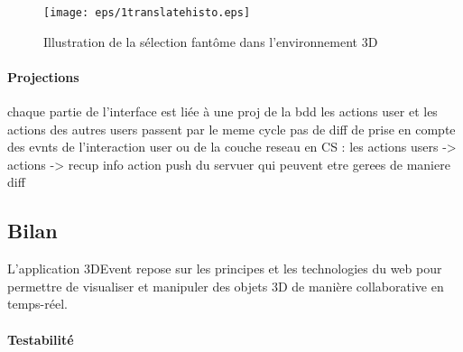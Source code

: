 \begin{figure}[ht]
	\centering
	\texttt{[image: eps/1translatehisto.eps]}
	\caption{Illustration de la sélection fantôme dans l'environnement 3D}
	\label{fig:ghostselection}
\end{figure}

\paragraph{Projections}
chaque partie de l’interface est liée à une proj de la bdd
les actions user et les actions des autres users passent par le meme cycle
pas de diff de prise en compte des evnts de l’interaction user ou de la couche 
reseau
en CS : les actions users -> actions -> recup info
action push du servuer qui peuvent etre gerees de maniere diff
\subsection{Bilan}

L'application 3DEvent repose sur les principes et les 
technologies du web pour permettre de visualiser et manipuler des objets \gls{3D} 
de 
manière 
collaborative en temps-réel.
\paragraph{Testabilité}